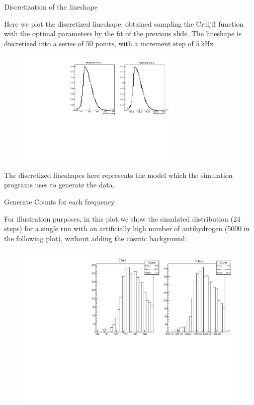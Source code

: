 \documentclass[8pt]{beamer}
\newcommand{\nologo}{\setbeamertemplate{logo}{}}
\begin{document}
{\nologo
\begin{frame}{Discretization of the lineshape}

Here we plot the discretized lineshape, obtained sampling the Cruijff function with the optimal parameters by the fit of the previous slide. The lineshape is discretized into a series of 50 points, with a increment step of $\SI{5}{\kilo \hertz}$.

\begin{figure}[hbtp]
\centering
\includegraphics[width = 0.7\textwidth]{../Plot/CruijffLineShapes.pdf}
\end{figure}

The discretized lineshapes here represents the model which the simulation programs uses to generate the data. 
\end{frame}

\begin{frame}{Generate Counts for each frequency}

For illustration purposes, in this plot we show the simulated distribution (24 steps) for a single run with an artificially high number of antihydrogen (5000 in the following plot), without adding the cosmic background:

\begin{figure}[hbtp]
\centering
\includegraphics[width = \textwidth]{../Plot/LineshapeSampled.pdf}
\end{figure}
\end{frame}
}
\end{document}
